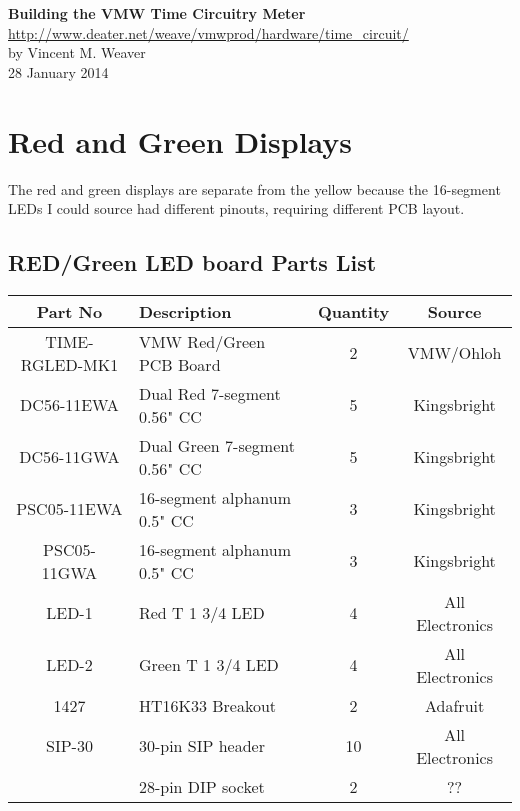 \documentclass[11pt]{article}
\begin{document}
\begin{center}
{\Large \bf Building the VMW Time Circuitry Meter}\\
\url{http://www.deater.net/weave/vmwprod/hardware/time_circuit/}\\
by Vincent M. Weaver\\
28 January 2014
\end{center}

\section{Red and Green Displays}

The red and green displays are separate from the yellow because
the 16-segment LEDs I could source had different pinouts, requiring
different PCB layout.

\subsection{RED/Green LED board Parts List}

\begin{tabular}{|c|l|c|c|}
\hline
Part No   &  Description    &  Quantity    &   Source \\
\hline
\hline
TIME-RGLED-MK1 & VMW Red/Green PCB Board       & 2 & VMW/Ohloh\\ %
\hline
DC56-11EWA     & Dual Red 7-segment 0.56" CC   & 5 & Kingsbright\\ %
\hline
DC56-11GWA     & Dual Green 7-segment 0.56" CC & 5 & Kingsbright\\ %
\hline
PSC05-11EWA    & 16-segment alphanum 0.5" CC   & 3 & Kingsbright\\ %
\hline
PSC05-11GWA    & 16-segment alphanum 0.5" CC   & 3 & Kingsbright\\ %
\hline
LED-1          & Red T 1 3/4 LED               & 4 & All Electronics\\ %
\hline
LED-2          & Green T 1 3/4 LED             & 4 & All Electronics\\ %
\hline
1427           & HT16K33 Breakout              & 2 & Adafruit\\ %
\hline
SIP-30	       & 30-pin SIP header             & 10 & All Electronics\\ %
\hline
               & 28-pin DIP socket             & 2 & ?? \\ %
\hline
\end{tabular}

\end{document}
